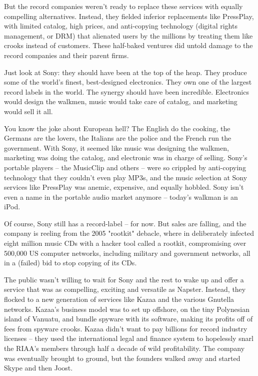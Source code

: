 But the record companies weren't ready to replace these services
with equally compelling alternatives. Instead, they fielded
inferior replacements like PressPlay, with limited catalog, high
prices, and anti-copying technology (digital rights management, or
DRM) that alienated users by the millions by treating them like
crooks instead of customers. These half-baked ventures did untold
damage to the record companies and their parent firms.

Just look at Sony: they should have been at the top of the heap.
They produce some of the world's finest, best-designed electronics.
They own one of the largest record labels in the world. The synergy
should have been incredible. Electronics would design the walkmen,
music would take care of catalog, and marketing would sell it all.

You know the joke about European hell? The English do the cooking,
the Germans are the lovers, the Italians are the police and the
French run the government. With Sony, it seemed like music was
designing the walkmen, marketing was doing the catalog, and
electronic was in charge of selling. Sony's portable players -- the
MusicClip and others -- were so crippled by anti-copying technology
that they couldn't even play MP3s, and the music selection at Sony
services like PressPlay was anemic, expensive, and equally hobbled.
Sony isn't even a name in the portable audio market anymore --
today's walkman is an iPod.

Of course, Sony still has a record-label -- for now. But sales are
falling, and the company is reeling from the 2005 "rootkit"
debacle, where in deliberately infected eight million music CDs
with a hacker tool called a rootkit, compromising over 500,000 US
computer networks, including military and government networks, all
in a (failed) bid to stop copying of its CDs.

The public wasn't willing to wait for Sony and the rest to wake up
and offer a service that was as compelling, exciting and versatile
as Napster. Instead, they flocked to a new generation of services
like Kazaa and the various Gnutella networks. Kazaa's business
model was to set up offshore, on the tiny Polynesian island of
Vanuatu, and bundle spyware with its software, making its profits
off of fees from spyware crooks. Kazaa didn't want to pay billions
for record industry licenses -- they used the international legal
and finance system to hopelessly snarl the RIAA's members through
half a decade of wild profitability. The company was eventually
brought to ground, but the founders walked away and started Skype
and then Joost.

